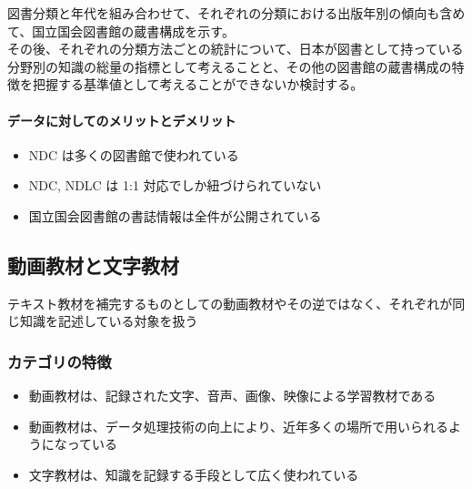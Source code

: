 図書分類と年代を組み合わせて、それぞれの分類における出版年別の傾向も含めて、国立国会図書館の蔵書構成を示す。\\
その後、それぞれの分類方法ごとの統計について、日本が図書として持っている分野別の知識の総量の指標として考えることと、その他の図書館の蔵書構成の特徴を把握する基準値として考えることができないか検討する。

\hypertarget{ux30c7ux30fcux30bfux306bux5bfeux3057ux3066ux306eux30e1ux30eaux30c3ux30c8ux3068ux30c7ux30e1ux30eaux30c3ux30c8-5}{%
\paragraph{データに対してのメリットとデメリット}\label{ux30c7ux30fcux30bfux306bux5bfeux3057ux3066ux306eux30e1ux30eaux30c3ux30c8ux3068ux30c7ux30e1ux30eaux30c3ux30c8-5}}

\begin{itemize}
\tightlist
\item
  NDC は多くの図書館で使われている
\item
  NDC, NDLC は 1:1 対応でしか紐づけられていない
\item
  国立国会図書館の書誌情報は全件が公開されている
\end{itemize}

\hypertarget{ux52d5ux753bux6559ux6750ux3068ux6587ux5b57ux6559ux6750}{%
\subsection{動画教材と文字教材}\label{ux52d5ux753bux6559ux6750ux3068ux6587ux5b57ux6559ux6750}}

テキスト教材を補完するものとしての動画教材やその逆ではなく、それぞれが同じ知識を記述している対象を扱う

\hypertarget{ux30abux30c6ux30b4ux30eaux306eux7279ux5fb4-4}{%
\subsubsection{カテゴリの特徴}\label{ux30abux30c6ux30b4ux30eaux306eux7279ux5fb4-4}}

\begin{itemize}
\tightlist
\item
  動画教材は、記録された文字、音声、画像、映像による学習教材である
\item
  動画教材は、データ処理技術の向上により、近年多くの場所で用いられるようになっている
\item
  文字教材は、知識を記録する手段として広く使われている
\end{itemize}

